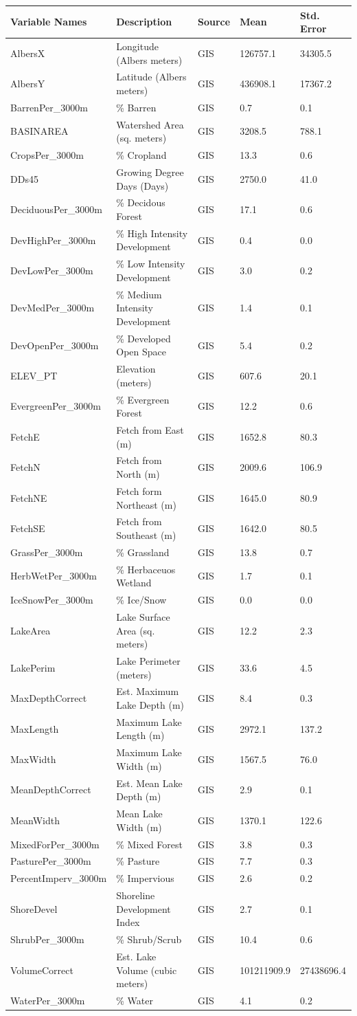 \documentclass[12pt,]{article}
\begin{document}
\begin{longtable}[c]{@{}lllll@{}}
\toprule
Variable Names & Description & Source & Mean & Std. Error\tabularnewline
\midrule
\endhead
AlbersX & Longitude (Albers meters) & GIS & 126757.1 &
34305.5\tabularnewline
AlbersY & Latitude (Albers meters) & GIS & 436908.1 &
17367.2\tabularnewline
BarrenPer\_3000m & \% Barren & GIS & 0.7 & 0.1\tabularnewline
BASINAREA & Watershed Area (sq. meters) & GIS & 3208.5 &
788.1\tabularnewline
CropsPer\_3000m & \% Cropland & GIS & 13.3 & 0.6\tabularnewline
DDs45 & Growing Degree Days (Days) & GIS & 2750.0 & 41.0\tabularnewline
DeciduousPer\_3000m & \% Decidous Forest & GIS & 17.1 &
0.6\tabularnewline
DevHighPer\_3000m & \% High Intensity Development & GIS & 0.4 &
0.0\tabularnewline
DevLowPer\_3000m & \% Low Intensity Development & GIS & 3.0 &
0.2\tabularnewline
DevMedPer\_3000m & \% Medium Intensity Development & GIS & 1.4 &
0.1\tabularnewline
DevOpenPer\_3000m & \% Developed Open Space & GIS & 5.4 &
0.2\tabularnewline
ELEV\_PT & Elevation (meters) & GIS & 607.6 & 20.1\tabularnewline
EvergreenPer\_3000m & \% Evergreen Forest & GIS & 12.2 &
0.6\tabularnewline
FetchE & Fetch from East (m) & GIS & 1652.8 & 80.3\tabularnewline
FetchN & Fetch from North (m) & GIS & 2009.6 & 106.9\tabularnewline
FetchNE & Fetch form Northeast (m) & GIS & 1645.0 & 80.9\tabularnewline
FetchSE & Fetch from Southeast (m) & GIS & 1642.0 & 80.5\tabularnewline
GrassPer\_3000m & \% Grassland & GIS & 13.8 & 0.7\tabularnewline
HerbWetPer\_3000m & \% Herbaceuos Wetland & GIS & 1.7 &
0.1\tabularnewline
IceSnowPer\_3000m & \% Ice/Snow & GIS & 0.0 & 0.0\tabularnewline
LakeArea & Lake Surface Area (sq. meters) & GIS & 12.2 &
2.3\tabularnewline
LakePerim & Lake Perimeter (meters) & GIS & 33.6 & 4.5\tabularnewline
MaxDepthCorrect & Est. Maximum Lake Depth (m) & GIS & 8.4 &
0.3\tabularnewline
MaxLength & Maximum Lake Length (m) & GIS & 2972.1 &
137.2\tabularnewline
MaxWidth & Maximum Lake Width (m) & GIS & 1567.5 & 76.0\tabularnewline
MeanDepthCorrect & Est. Mean Lake Depth (m) & GIS & 2.9 &
0.1\tabularnewline
MeanWidth & Mean Lake Width (m) & GIS & 1370.1 & 122.6\tabularnewline
MixedForPer\_3000m & \% Mixed Forest & GIS & 3.8 & 0.3\tabularnewline
PasturePer\_3000m & \% Pasture & GIS & 7.7 & 0.3\tabularnewline
PercentImperv\_3000m & \% Impervious & GIS & 2.6 & 0.2\tabularnewline
ShoreDevel & Shoreline Development Index & GIS & 2.7 &
0.1\tabularnewline
ShrubPer\_3000m & \% Shrub/Scrub & GIS & 10.4 & 0.6\tabularnewline
VolumeCorrect & Est. Lake Volume (cubic meters) & GIS & 101211909.9 &
27438696.4\tabularnewline
WaterPer\_3000m & \% Water & GIS & 4.1 & 0.2\tabularnewline

\end{longtable}
\end{document}
